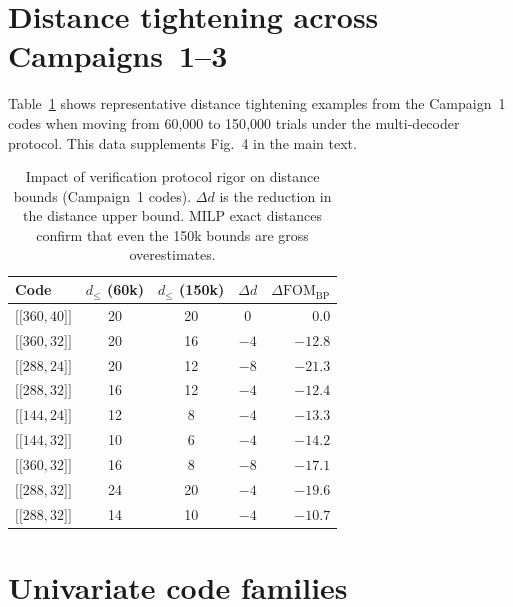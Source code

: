 \documentclass[aps,prxquantum,twocolumn,superscriptaddress,nofootinbib]{revtex4-2}
\newcommand{\dblbrk}[1]{\ensuremath{\lbrack\!\lbrack #1 \rbrack\!\rbrack}}
\newcommand{\code}[1]{\dblbrk{#1}}
\newcommand{\FOM}{\ensuremath{\mathrm{FOM}}}
\begin{document}
\section{Distance tightening across Campaigns~1--3}
\label{sm:tightening}

Table~\ref{tab:decoder_comparison_full} shows representative distance tightening examples from the Campaign~1 codes when moving from 60{,}000 to 150{,}000 trials under the multi-decoder protocol.
This data supplements Fig.~4 in the main text.

\begin{table}[t]
\centering
\caption{Impact of verification protocol rigor on distance bounds (Campaign~1 codes).
$\Delta d$ is the reduction in the distance upper bound.
MILP exact distances confirm that even the 150k bounds are gross overestimates.}
\label{tab:decoder_comparison_full}
\begin{tabular}{lcccr}
\toprule
Code & $d_{\leq}$ (60k) & $d_{\leq}$ (150k) & $\Delta d$ & $\Delta\FOM_{\text{BP}}$ \\
\midrule
$\code{360,40}$ & 20 & 20 & 0 & 0.0 \\
$\code{360,32}$ & 20 & 16 & $-4$ & $-12.8$ \\
$\code{288,24}$ & 20 & 12 & $-8$ & $-21.3$ \\
$\code{288,32}$ & 16 & 12 & $-4$ & $-12.4$ \\
$\code{144,24}$ & 12 & 8 & $-4$ & $-13.3$ \\
$\code{144,32}$ & 10 & 6 & $-4$ & $-14.2$ \\
$\code{360,32}$ & 16 & 8 & $-8$ & $-17.1$ \\
$\code{288,32}$ & 24 & 20 & $-4$ & $-19.6$ \\
$\code{288,32}$ & 14 & 10 & $-4$ & $-10.7$ \\
\bottomrule
\end{tabular}
\end{table}

\section{Univariate code families}
\label{sm:univariate}
\end{document}

